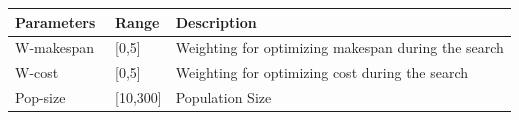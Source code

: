 \documentclass{llncs}
\def\WMAKESPAN{{W-makespan}}
\def\WCOST{{W-cost}}
\begin{document}
\begin{table}[tb!]
\scriptsize
\begin{tabular}{|l|l|l|}
\hline
Parameters 	&	   Range 	&	Description\\					
\hline									
\WMAKESPAN\	&	[0,5]	&	Weighting for  optimizing  makespan during the search  \\
\WCOST\ 	&	[0,5]	&	  Weighting for optimizing cost during the search\\	
\hline
Pop-size 	&	[10,300]	&	 Population Size\\

\end{tabular}
\end{table}
\end{document}
